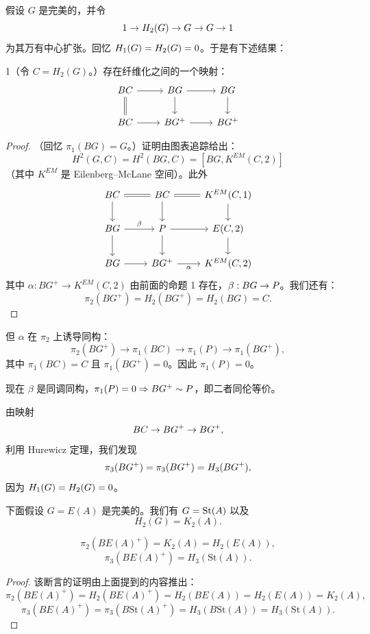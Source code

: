 假设 $G$ 是完美的，并令
\[ 1\to H_2(G)\to G\to G\to 1 \]
为其万有中心扩张。回忆 $H_1(G)=H_2( G)=0$。于是有下述结果：

\begin{lem}{1}（令 $C=H_2(G)$。）存在纤维化之间的一个映射：
\[
\begin{tikzcd}
BC \arrow[r] \arrow[d,equal] & B\wt G \arrow[r] \arrow[d] & BG \arrow[d] \\
BC \arrow[r] & B\wt G^+ \arrow[r] & BG^+
\end{tikzcd}
\]
\end{lem}

\begin{proof}
（回忆 $\pi_1(BG)=G$。）证明由图表追踪给出：
\[ H^2(G,C)=H^2(BG,C)=[BG,K^{EM}(C,2)] \]
（其中 $K^{EM}$ 是 Eilenberg--McLane 空间）。此外
\[
\begin{tikzcd}
BC \arrow[r,equal] \arrow[d] & BC \arrow[r,equal] \arrow[d] & {K^{EM}(C,1)} \arrow[d] \\
B\wt G \arrow[r,"\beta"] \arrow[d] & P \arrow[r] \arrow[d] & {E(C,2)} \arrow[d] \\
BG \arrow[r] & BG^+ \arrow[r,"\alpha"'] & {K^{EM}(C,2)}
\end{tikzcd}
\]
其中 $\alpha:BG^+\to K^{EM}(C,2)$ 由前面的命题 1 存在，$\beta:B G\to P$。我们还有：
\[ \pi_2(BG^+)=H_2(BG^+)=H_2(BG)=C. \]
\end{proof}


但 $\alpha$ 在 $\pi_2$ 上诱导同构：
\[ \pi_2(BG^+)\to\pi_1(BC)\to\pi_1(P)\to\pi_1(BG^+), \]
其中 $\pi_1(BC)=C$ 且 $\pi_1(BG^+)=0$。因此 $\pi_1(P)=0$。

现在 $\beta$ 是同调同构，$\pi_1(P)=0\Rightarrow B G^+\sim P$，即二者同伦等价。

由映射
\[ BC\to B G^+\to BG^+, \]
利用 Hurewicz 定理，我们发现
\[ \pi_3(BG^+)=\pi_3(B G^+)=H_3(B G^+), \]
因为 $H_1( G)=H_2( G)=0$。

下面假设 $G=E(A)$ 是完美的。我们有 $ G=\mathrm{St}(A)$ 以及
\[ H_2(G)=K_2(A). \]

\[ \pi_2(BE(A)^+)=K_2(A)=H_2(E(A)), \]
\[ \pi_3(BE(A)^+)=H_3(\mathrm{St}(A)). \]

\begin{proof}
该断言的证明由上面提到的内容推出：
\[ \pi_2(BE(A)^+)=H_2(BE(A)^+)=H_2(BE(A))=H_2(E(A))=K_2(A), \]
\[ \pi_3(BE(A)^+)=\pi_3(B\mathrm{St}(A)^+)=H_3(B\mathrm{St}(A))=H_3(\mathrm{St}(A)). \]
\end{proof}

